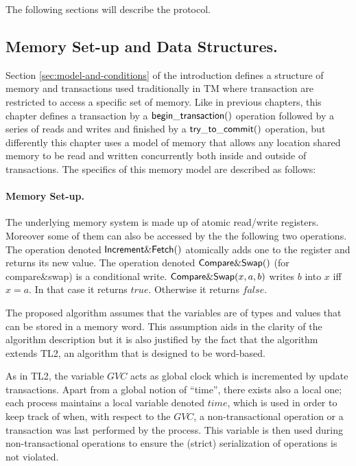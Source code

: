 The following sections will describe the protocol.
\subsection{Memory Set-up and Data Structures.}

Section \ref{sec:model-and-conditions} of the introduction defines a
structure of memory and transactions used traditionally in TM where
transaction are restricted to access a specific set of memory.
Like in previous chapters, this chapter defines a transaction by a $\sf{begin\_transaction}()$ operation
followed by a series of reads and writes and finished by a $\sf{try\_to\_commit}()$ operation,
but differently this chapter uses a model
of memory that allows any location shared memory to be read and written concurrently
both inside and outside of transactions.
The specifics of this memory model are described as follows:

\paragraph{Memory Set-up.}
The underlying memory system is made up of atomic read/write registers. 
Moreover some of them can also be accessed by the the following two 
operations. The operation denoted 
${\sf Increment\&Fetch}()$ atomically adds one to the register and 
returns its new value. 
 The operation denoted 
${\sf Compare\&Swap}()$ (for compare\&swap) is a conditional write. 
${\sf Compare\&Swap}(x,a,b)$ writes $b$ into $x$ iff $x=a$. In that case it 
returns $\mathit{true}$. Otherwise it returns  $\mathit{false}$. 


The proposed algorithm assumes that the
variables  are  of  types and  values  that  can  be   stored in  a  memory
word. This assumption aids in the clarity of the algorithm description  
but it  is also  justified by the  fact that  the algorithm extends  TL2, an
algorithm that is   designed to be word-based. 

As in TL2,  the variable $\mathit{GVC}$
acts as  global  clock  which  is incremented  by update transactions.
 Apart from a global   notion of ``time'', there exists also
a local one; each process maintains a local  
variable denoted $\mathit{time}$,  which is used in order to keep  
track of when, with
respect to the $\mathit{GVC}$, a non-transactional operation 
or a transaction was last performed by
the  process.
This variable is then used during non-transactional operations to ensure
the (strict) serialization of operations is not violated.

